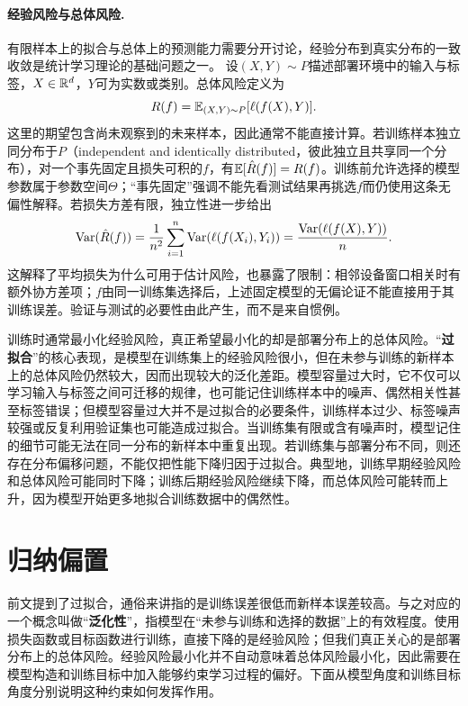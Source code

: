 \paragraph{经验风险与总体风险.}  
有限样本上的拟合与总体上的预测能力需要分开讨论，经验分布到真实分布的一致收敛是统计学习理论的基础问题之一\cite{vapnik1971uniform}。
设$(X,Y)\sim P$描述部署环境中的输入与标签，$X\in\mathbb{R}^d$，$Y$可为实数或类别。总体风险定义为
\begin{equation}
 R(f)=\mathbb{E}_{(X,Y)\sim P}[\ell(f(X),Y)].
\end{equation}
这里的期望包含尚未观察到的未来样本，因此通常不能直接计算。若训练样本独立同分布于$P$（independent and identically distributed，彼此独立且共享同一个分布），对一个事先固定且损失可积的$f$，有$\mathbb{E}[\hat R(f)]=R(f)$。训练前允许选择的模型参数属于参数空间$\Theta$；“事先固定”强调不能先看测试结果再挑选$f$而仍使用这条无偏性解释。若损失方差有限，独立性进一步给出
\begin{equation}
 \operatorname{Var}(\hat R(f))=\frac{1}{n^2}\sum_{i=1}^n\operatorname{Var}(\ell(f(X_i),Y_i))
 =\frac{\operatorname{Var}(\ell(f(X),Y))}{n}.
\end{equation}
这解释了平均损失为什么可用于估计风险，也暴露了限制：相邻设备窗口相关时有额外协方差项；$f$由同一训练集选择后，上述固定模型的无偏论证不能直接用于其训练误差。验证与测试的必要性由此产生，而不是来自惯例。

训练时通常最小化经验风险，真正希望最小化的却是部署分布上的总体风险。“\textbf{过拟合}”的核心表现，是模型在训练集上的经验风险很小，但在未参与训练的新样本上的总体风险仍然较大，因而出现较大的泛化差距。模型容量过大时，它不仅可以学习输入与标签之间可迁移的规律，也可能记住训练样本中的噪声、偶然相关性甚至标签错误；但模型容量过大并不是过拟合的必要条件，训练样本过少、标签噪声较强或反复利用验证集也可能造成过拟合。当训练集有限或含有噪声时，模型记住的细节可能无法在同一分布的新样本中重复出现。若训练集与部署分布不同，则还存在分布偏移问题，不能仅把性能下降归因于过拟合。典型地，训练早期经验风险和总体风险可能同时下降；训练后期经验风险继续下降，而总体风险可能转而上升，因为模型开始更多地拟合训练数据中的偶然性。


\section{归纳偏置}

前文提到了过拟合，通俗来讲指的是训练误差很低而新样本误差较高。与之对应的一个概念叫做“\textbf{泛化性}”，指模型在“未参与训练和选择的数据”上的有效程度。使用损失函数或目标函数进行训练，直接下降的是经验风险；但我们真正关心的是部署分布上的总体风险。经验风险最小化并不自动意味着总体风险最小化，因此需要在模型构造和训练目标中加入能够约束学习过程的偏好。下面从模型角度和训练目标角度分别说明这种约束如何发挥作用。

